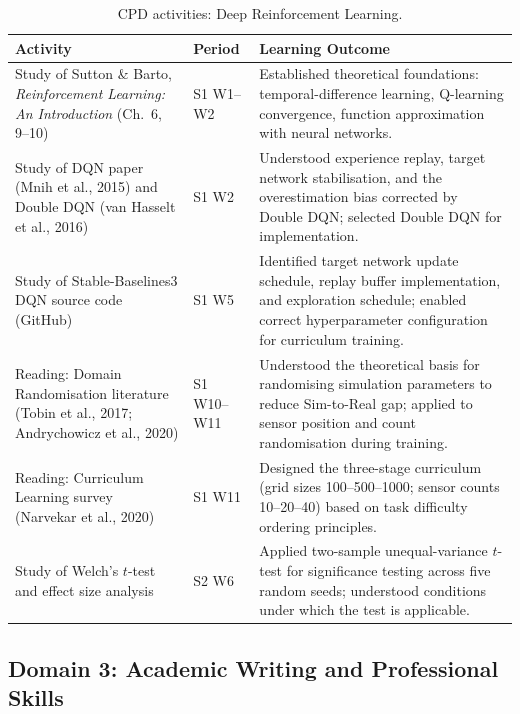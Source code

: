 \begin{table}[H]
\centering
\caption{CPD activities: Deep Reinforcement Learning.}
\label{tab:cpd_drl}
\begin{tabularx}{\textwidth}{p{3.5cm} p{2cm} X}
\toprule
\textbf{Activity} & \textbf{Period} & \textbf{Learning Outcome} \\
\midrule
Study of Sutton \& Barto, \textit{Reinforcement Learning: An Introduction} (Ch.\ 6, 9--10) & S1 W1--W2 & Established theoretical foundations: temporal-difference learning, Q-learning convergence, function approximation with neural networks. \\
\midrule
Study of DQN paper (Mnih et al., 2015) and Double DQN (van Hasselt et al., 2016) & S1 W2 & Understood experience replay, target network stabilisation, and the overestimation bias corrected by Double DQN; selected Double DQN for implementation. \\
\midrule
Study of Stable-Baselines3 DQN source code (GitHub) & S1 W5 & Identified target network update schedule, replay buffer implementation, and exploration schedule; enabled correct hyperparameter configuration for curriculum training. \\
\midrule
Reading: Domain Randomisation literature (Tobin et al., 2017; Andrychowicz et al., 2020) & S1 W10--W11 & Understood the theoretical basis for randomising simulation parameters to reduce Sim-to-Real gap; applied to sensor position and count randomisation during training. \\
\midrule
Reading: Curriculum Learning survey (Narvekar et al., 2020) & S1 W11 & Designed the three-stage curriculum (grid sizes 100--500--1000; sensor counts 10--20--40) based on task difficulty ordering principles. \\
\midrule
Study of Welch's $t$-test and effect size analysis & S2 W6 & Applied two-sample unequal-variance $t$-test for significance testing across five random seeds; understood conditions under which the test is applicable. \\
\bottomrule
\end{tabularx}
\end{table}

\subsection*{Domain 3: Academic Writing and Professional Skills}

